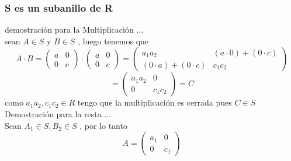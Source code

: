 \documentclass[10pt,a4paper]{article} %
\begin{document}
            \subsubsection{S es un subanillo de R}
                demostración para la Multiplicación ...
                \\
                sean $ A \in S  $  y $ B \in S  $ , luego tenemos que
                \begin{equation}
                    A \cdot B = \begin{pmatrix}
                        a & 0
                        \\
                        0 & c
                    \end{pmatrix}
                    \cdot \begin{pmatrix}
                        a & 0
                        \\
                        0 & c
                    \end{pmatrix}
                    =
                    \begin{pmatrix}
                        a _1 a_2  & (a \cdot 0) + (0 \cdot c)
                        \\
                        (0 \cdot a) + (0 \cdot c) & c_1 c_2
                    \end{pmatrix}
                \end{equation}
                \begin{equation}
                     = \begin{pmatrix}
                        a_1 a_2  & 0
                        \\
                        0 & c_1 c_2
                    \end{pmatrix}
                    = C
                \end{equation}
                como $ a _1 a_2  , c_1c_2 \in R    $ tengo que la multiplicación es
                cerrada pues $ C \in S  $
                \\
                Demostración para la resta ...
                \\
                Sean $ A_1 \in S , B_2 \in S  $ , por lo tanto
                \begin{equation}
                    A = \begin{pmatrix}
                        a_1  & 0
                        \\
                        0 & c_1
                    \end{pmatrix}
                \end{equation}
\end{document}
